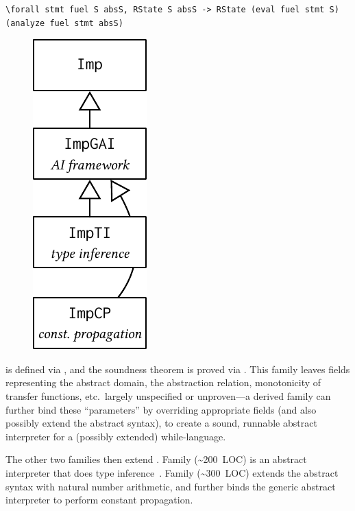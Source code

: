 \begin{centered}
\begin{minipage}{.91\textwidth}
\begin{lstlisting}[basicstyle=\fontsize{8.25}{9}\ttfamily]
\forall stmt fuel S absS, RState S absS -> RState (eval fuel stmt S) (analyze fuel stmt absS)
\end{lstlisting}
\end{minipage}
\end{centered}

\begin{figure}
\includegraphics[scale=.68]{graphics/ai-casestudy.pdf}
\end{figure}

\noindent
{} is defined via , and the soundness theorem
is proved via .
This family leaves fields representing the abstract domain, the
abstraction relation, monotonicity of transfer functions, etc.\ 
largely unspecified or unproven---a derived family can further bind
these ``parameters'' by overriding appropriate fields (and also possibly
extend the abstract syntax), to create a sound, runnable abstract
interpreter for a (possibly extended) while-language.

The other two families then extend .
Family  (\textasciitilde200~LOC) is an abstract
interpreter that does type inference~\cite{cousot1997types}.
Family  (\textasciitilde300~LOC) extends the abstract syntax
with natural number arithmetic,
and further binds the generic abstract interpreter to perform constant propagation.

